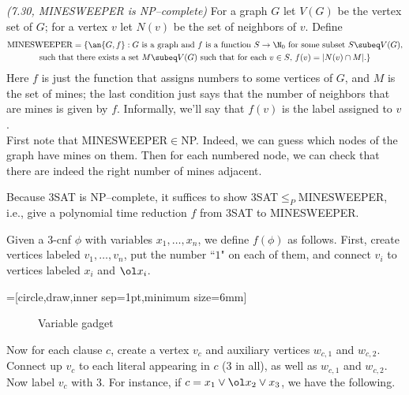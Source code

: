 \begin{problem}{\it(7.30, MINESWEEPER is NP--complete)}
For a graph $G$ let $V(G)$ be the vertex set of $G$; for a vertex $v$ let $N(v)$ be the set of neighbors of $v$. 
Define
\begin{gather*}
\text{MINESWEEPER}
=\{
\an{G,f}
:G\text{ is a graph and }f\text{ is a function $S\to \N_{0}$ for some subset $S\subeq V(G)$,}\\
\text{such that there exists a set $M\subeq V(G)$ such that for each $v\in S$, $f(v)=|N(v)\cap M|$.}\}
\end{gather*}
Here $f$ is just the function that assigns numbers to some vertices of $G$, and $M$ is the set of mines; the last condition just says that the number of neighbors that are mines is given by $f$. Informally, we'll say that $f(v)$ is the label assigned to $v$.\\


First note that MINESWEEPER$\in$NP. Indeed, we can guess which nodes of the graph have mines on them. Then for each numbered node, we can check that there are indeed the right number of mines adjacent.

Because 3SAT is NP--complete, it suffices to show 3SAT$\le_P $MINESWEEPER, i.e., give a polynomial time reduction $f$ from 3SAT to MINESWEEPER.

Given a 3-cnf $\phi$ with variables $x_1,\ldots, x_n$, we define $f(\phi)$ as follows. First, create vertices labeled $v_1,\ldots, v_n$, put the number ``$1$" on each of them, and connect $v_i$ to vertices labeled $x_i$ and $\ol x_i$.

=[circle,draw,inner sep=1pt,minimum size=6mm]
\begin{figure}[h!]
\begin{center}
\caption{Variable gadget}
\end{center}
\end{figure}

Now for each clause $c$, create a vertex $v_{c}$ and auxiliary vertices $w_{c,1}$ and $w_{c,2}$. Connect up $v_c$ to each literal appearing in $c$ (3 in all), as well as $w_{c,1}$ and $w_{c,2}$. Now label $v_c$ with 3. For instance, if $c=x_1\vee \ol x_2\vee x_3$, we have the following.


\end{problem}
